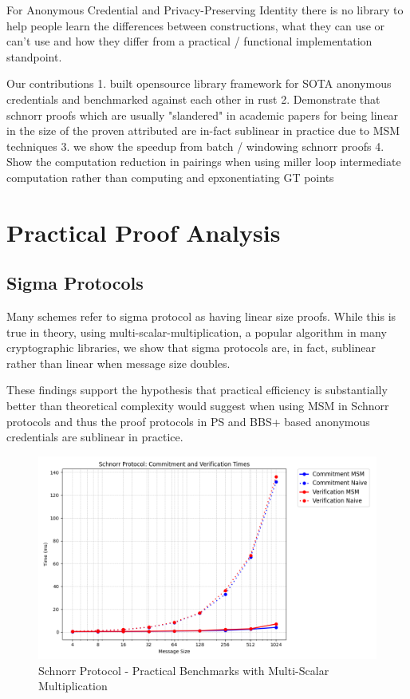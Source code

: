 
For Anonymous Credential and Privacy-Preserving Identity there is no library to help people learn the differences between constructions, what they can use or can't use and how they differ from a practical / functional implementation standpoint. 

Our contributions
1. built opensource library framework for SOTA anonymous credentials and benchmarked against each other in rust
2. Demonstrate that schnorr proofs which are usually "slandered" in academic papers for being linear in the size of the proven attributed are in-fact sublinear in practice due to MSM techniques
3. we show the speedup from batch / windowing schnorr proofs 
4. Show the computation reduction in pairings when using miller loop intermediate computation rather than computing and epxonentiating GT points



\section{Practical Proof Analysis}
\subsection{Sigma Protocols}\label{sigma-protocol-analysis}
Many schemes refer to sigma protocol as having linear size proofs. 
While this is true in theory, using multi-scalar-multiplication, a popular algorithm in many cryptographic libraries, we show that sigma protocols are, in fact, sublinear rather than linear when message size doubles.

These findings support the hypothesis that practical efficiency is substantially better than theoretical complexity would suggest when using MSM in Schnorr protocols and thus the proof protocols in PS and BBS+ based anonymous credentials are sublinear in practice.

\begin{figure}
    \centering
    \includegraphics[width=0.75\linewidth]{schnorr_msm_no_msm.png}
    \caption{Schnorr Protocol - Practical Benchmarks with Multi-Scalar Multiplication}
    \label{fig:schnorr-benchmarks}
\end{figure}




